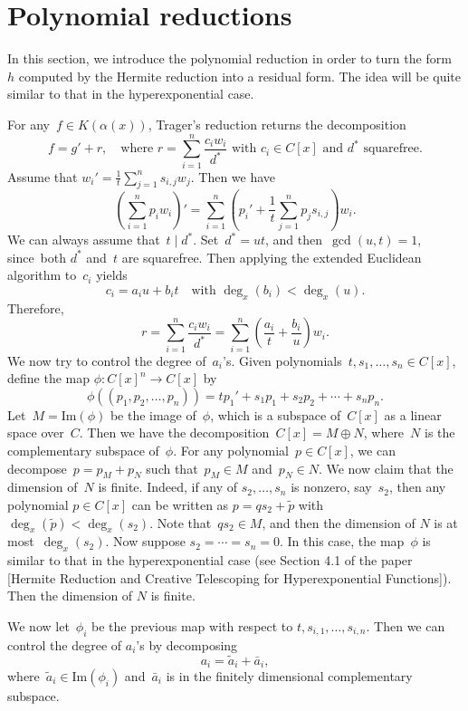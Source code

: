\documentclass[a4paper,draft]{article}
\newcommand{\red}{\color{red}}
\begin{document}
\section{Polynomial reductions}
{\red In this section, we introduce the polynomial reduction in order to turn the form~$h$ computed by the
Hermite reduction into a residual form. The idea will be quite similar to that in the hyperexponential case.


For any~$f \in K(\alpha(x))$, Trager's reduction returns the decomposition
\[f  = g' + r, \quad \text{where~$r =\sum_{i=1}^n \frac{c_iw_i}{d^*}$ with~$c_i\in C[x]$ and~$d^*$ squarefree}.\]
Assume that $w_i' = \frac{1}{t}\sum_{j=1}^n s_{i, j}w_j$. Then we have
\[(\sum_{i=1}^n p_i w_i)' = \sum_{i=1}^n (p_i' + \frac{1}{t}\sum_{j=1}^n p_js_{i, j})w_i.\]
We can always assume that~$t\mid d^*$. Set~$d^* = ut$, and then~$\gcd(u, t)=1$, since~both $d^*$ and~$t$ are squarefree.
Then applying the extended Euclidean algorithm to~$c_i$ yields
\[c_i = a_iu + b_i t \quad \text{with~$\deg_x(b_i) < \deg_x(u)$}.\]
Therefore,
\[r =\sum_{i=1}^n \frac{c_iw_i}{d^*} = \sum_{i=1}^n \left(\frac{a_i}{t}+ \frac{b_i}{u}\right)w_i. \]
We now try to control the degree of~$a_i$'s. Given polynomials~$t, s_1, \ldots, s_n \in C[x]$,
define the  map $\phi: C[x]^n \rightarrow C[x]$ by
\[\phi((p_1, p_2, \ldots, p_n)) = tp_1' + s_1p_1+ s_2p_2 + \cdots + s_np_n.\]
Let~$M = \text{Im}(\phi)$ be the image of~$\phi$, which is a subspace of~$C[x]$ as a linear space over~$C$.
Then we have the decomposition~$C[x] = M \oplus N$, where~$N$ is the complementary subspace of~$\phi$.
For any polynomial~$p\in C[x]$, we can decompose~$p= p_M + p_N$ such that~$p_M\in M$ and~$p_N \in N$.
We now claim that the dimension of~$N$ is finite. Indeed, if any of $s_2, \ldots, s_n$ is nonzero, say~$s_2$, then
any polynomial $p\in C[x]$ can be written as $p = qs_2 + \tilde{p}$ with~$\deg_x(\tilde p) < \deg_x(s_2)$.
Note that~$qs_2 \in M$, and then the dimension of $N$ is at most~$\deg_x(s_2)$. Now suppose $s_2=\cdots=s_n=0$.
In this case, the map~$\phi$ is similar to that in the hyperexponential case (see Section 4.1 of the paper
[Hermite Reduction and Creative Telescoping for Hyperexponential Functions]). Then the dimension of $N$ is finite.

We now let~$\phi_i$ be the previous map with respect to ${t, s_{i, 1}, \ldots, s_{i, n}}$. Then we can control the degree of $a_i$'s by decomposing
\[a_i = \tilde a_i + \bar a_i, \]
where~$\tilde a_i \in \text{Im}(\phi_i)$ and~$\bar a_i$ is in the finitely dimensional complementary subspace.

}
\end{document}
